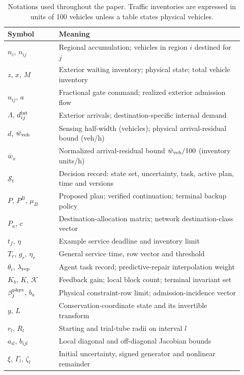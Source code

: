 \documentclass[preprint,12pt]{elsarticle}
\begin{document}
\begin{table}[!tp]
\centering\small
\caption{Notations used throughout the paper. Traffic inventories are expressed in units of
100 vehicles unless a table states physical vehicles.}
\label{tab:nomenclature}
\renewcommand{\arraystretch}{0.98}
\begin{tabular}{@{}p{0.20\linewidth}p{0.72\linewidth}@{}}
\toprule
Symbol & Meaning\\
\midrule
$n_i$, $n_{ij}$ & Regional accumulation; vehicles in region $i$ destined for $j$\\
$z$, $x$, $M$ & Exterior waiting inventory; physical state; total vehicle inventory\\
$u_{ij}$, $a$ & Fractional gate command; realized exterior admission flow\\
$\Lambda$, $d^{\rm int}_{ij}$ & Exterior arrivals; destination-specific internal demand\\
$d$, $\bar w_{\rm veh}$ & Sensing half-width (vehicles); physical arrival-residual bound (veh/h)\\
$\bar w_x$ & Normalized arrival-residual bound $\bar w_{\rm veh}/100$ (inventory units/h)\\
$\mathcal S_t$ & Decision record: state set, uncertainty, task, active plan, time and versions\\
$P$, $P^B$, $\mu_B$ & Proposed plan; verified continuation; terminal backup policy\\
$P_a$, $c$ & Destination-allocation matrix; network destination-class vector\\
$t_f$, $\eta$ & Example service deadline and inventory limit\\
$T_r$, $g_r$, $\eta_r$ & General service time, row vector and threshold\\
$\theta_i$, $\lambda_{\rm rep}$ & Agent task record; predictive-repair interpolation weight\\
$K_b$, $K$, $\mathcal K$ & Feedback gain; local block count; terminal invariant set\\
$\beta_j^{\rm phys}$, $b_a$ & Physical constraint-row limit; admission-incidence vector\\
$y$, $L$ & Conservation-coordinate state and its invertible transform\\
$r_l$, $R_l$ & Starting and trial-tube radii on interval $l$\\
$a_{il}$, $b_{ijl}$ & Local diagonal and off-diagonal Jacobian bounds\\
$\xi$, $\Gamma_l$, $\zeta_l$ & Initial uncertainty, signed generator and nonlinear remainder\\

\end{tabular}
\end{table}
\end{document}
